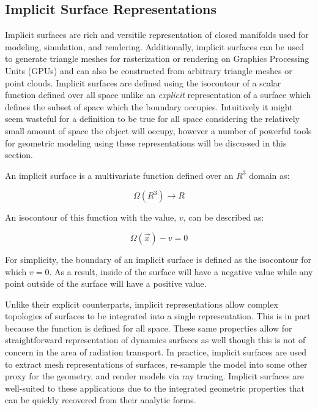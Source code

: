 \documentclass[12pt, a4paper]{article}
\begin{document}

\subsection{Implicit Surface Representations}%
\label{implicit_surfaces}

Implicit surfaces are rich and versitile representation of closed manifolds used for modeling, simulation, and rendering. Additionally, implicit surfaces can be used to generate triangle meshes for rasterization or rendering on Graphics Processing Units (GPUs)\cite{Set96} and can also be constructed from arbitrary triangle meshes or point clouds\cite{Lev98}. Implicit surfaces are defined using the isocontour of a scalar function defined over all space unlike an \textit{explicit} representation of a surface which defines the subset of space which the boundary occupies. Intuitively it might seem wasteful for a definition to be true for all space considering the relatively small amount of space the object will occupy, however a number of powerful tools for geometric modeling using these representations will be discussed in this section.



An implicit surface is a multivariate function defined over an $ R^3 $ domain as:

\begin{equation}
    \Omega(R^3)\rightarrow R
\end{equation}

An isocontour of this function with the value, $v$, can be described as:

\begin{equation}
  \Omega(\vec{x}) - v  = 0 
\end{equation}

For simplicity, the boundary of an implicit surface is defined as the isocontour for which $v=0$. As a result, inside of the surface will have a negative value while any point outside of the surface will have a positive value.

Unlike their explicit counterparts, implicit representations allow complex topologies of surfaces to be integrated into a single representation. This is in part because the function is defined for all space. These same properties allow for straightforward representation of dynamics surfaces as well though this is not of concern in the area of radiation transport. In practice, implicit surfaces are used to extract mesh representations of surfaces, re-sample the model into some other proxy for the geometry, and render models via ray tracing. Implicit surfaces are well-suited to these applications due to the integrated geometric properties that can be quickly recovered from their analytic forms. 
\end{document}
